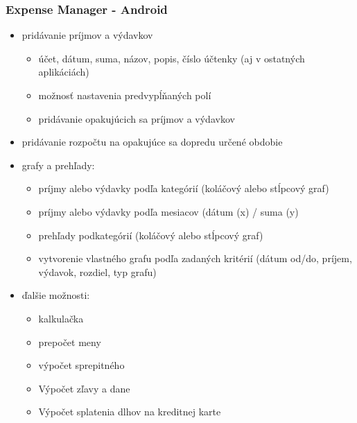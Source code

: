 \documentclass[12pt]{book}
\begin{document}
\subsubsection{Expense Manager - Android \cite{ExpenseManager}\ }
\begin{itemize}
\item{pridávanie príjmov a výdavkov}
\begin{itemize}
\item{účet, dátum, suma, názov, popis, číslo účtenky (aj v ostatných aplikáciách)}
\item{možnosť nastavenia predvypĺňaných polí}
\item{pridávanie opakujúcich sa príjmov a výdavkov}
\end{itemize}
\item{pridávanie rozpočtu na opakujúce sa dopredu určené obdobie}
\item{grafy a prehľady:}
\begin{itemize}
\item{príjmy alebo výdavky podľa kategórií (koláčový alebo stĺpcový graf)}
\item{príjmy alebo výdavky podľa mesiacov (dátum (x) / suma (y)}
\item{prehľady podkategórií (koláčový alebo stĺpcový graf)}
\item{vytvorenie vlastného grafu podľa zadaných kritérií (dátum od/do, príjem, výdavok, rozdiel, typ grafu)}
\end{itemize}
\item{ďalšie možnosti:}
\begin{itemize}
\item{kalkulačka}
\item{prepočet meny}
\item{výpočet sprepitného}
\item{Výpočet zľavy a dane}
\item{Výpočet splatenia dlhov na kreditnej karte}
\end{itemize}
\end{itemize}
\end{document}
